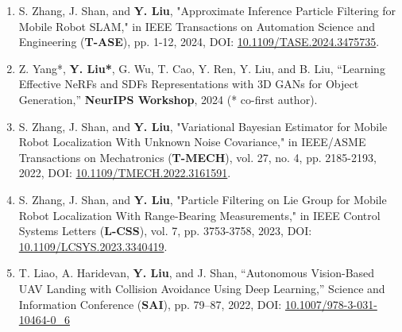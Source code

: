\begin{enumerate}
    \item S. Zhang, J. Shan, and \textbf{Y. Liu}, "Approximate Inference Particle Filtering for Mobile Robot SLAM," in IEEE Transactions on Automation Science and Engineering (\textbf{T-ASE}), pp. 1-12, 2024, DOI: \url{10.1109/TASE.2024.3475735}. 
    
     \item Z. Yang*, \textbf{Y. Liu*}, G. Wu, T. Cao, Y. Ren, Y. Liu, and B. Liu, “Learning Effective NeRFs and SDFs Representations with 3D GANs for Object Generation,” \textbf{NeurIPS Workshop}, 2024 (* co-first author).

    \item S. Zhang, J. Shan, and \textbf{Y. Liu}, "Variational Bayesian Estimator for Mobile Robot Localization With Unknown Noise Covariance," in IEEE/ASME Transactions on Mechatronics (\textbf{T-MECH}), vol. 27, no. 4, pp. 2185-2193, 2022, DOI: \url{10.1109/TMECH.2022.3161591}. 

    \item S. Zhang, J. Shan, and \textbf{Y. Liu}, "Particle Filtering on Lie Group for Mobile Robot Localization With Range-Bearing Measurements," in IEEE Control Systems Letters (\textbf{L-CSS}), vol. 7, pp. 3753-3758, 2023, DOI: \url{10.1109/LCSYS.2023.3340419}.

    \item T. Liao, A. Haridevan, \textbf{Y. Liu}, and J. Shan, “Autonomous Vision-Based UAV Landing with Collision Avoidance Using Deep Learning,” Science and Information Conference (\textbf{SAI}), pp. 79–87, 2022, DOI: \url{10.1007/978-3-031-10464-0_6}
    
\end{enumerate}
    


    





